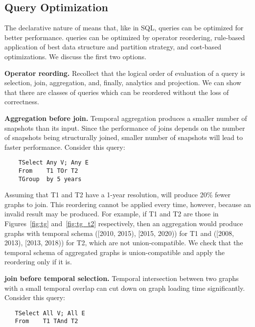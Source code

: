 \subsection{Query Optimization}
\label{sec:sys:optimization}

The declarative nature of \ql means that, like in SQL, queries can be
optimized for better performance.  \ql queries can be optimized by
operator reordering, rule-based application of best data structure and
partition strategy, and cost-based optimizations.  We discuss the
first two options.

{\bf Operator reording.} Recollect that the logical order of
evaluation of a \ql query is selection, join, aggregation, and,
finally, analytics and projection.  We can show that there are classes
of queries which can be reordered without the loss of correctness.

{\bf Aggregation before join.}  Temporal aggregation produces a
smaller number of snapshots than its input.  Since the performance of
joins depends on the number of snapshots being structurally joined,
smaller number of snapshots will lead to faster performance.  Consider
this query:

\begin{small}
\begin{verbatim}
    TSelect Any V; Any E
    From    T1 TOr T2
    TGroup  by 5 years
\end{verbatim}
\end{small}

Assuming that T1 and T2 have a 1-year resolution,  will
produce 20\% fewer graphs to join.  This reordering cannot be applied
every time, however, because an invalid result may be produced.  For
example, if T1 and T2 are those in Figures~\ref{fig:tg}
and~\ref{fig:tg_t2} respectively, then an aggregation would produce
graphs with temporal schema ([2010, 2015), [2015, 2020)) for T1 and
    ([2008, 2013), [2013, 2018)) for T2, which are not
        union-compatible.  We check that the temporal schema of
        aggregated graphs is union-compatible and apply the reordering
        only if it is.

{\bf {} join before temporal selection.}  Temporal
intersection between two graphs with a small temporal overlap can cut
down on graph loading time significantly.  Consider this query:

\begin{small}
\begin{verbatim}
   TSelect All V; All E
   From    T1 TAnd T2
\end{verbatim}
\end{small}

